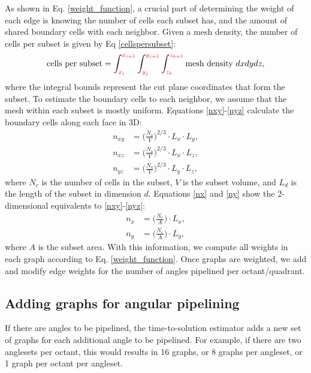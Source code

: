 As shown in Eq. \ref{weight_function}, a crucial part of determining the weight of each edge is knowing the number of cells each subset has, and the amount of shared boundary cells with each neighbor. Given a mesh density, the number of cells per subset is given by Eq \ref{cellspersubset}:
\begin{equation}
   \text{cells per subset} = \int_{\textcolor{red}{x_i}}^{\textcolor{red}{x_{i+1}}} \int_{\textcolor{red}{y_j}}^{\textcolor{red}{y_{j+1}}} \int_{\textcolor{red}{z_k}}^{\textcolor{red}{z_{k+1}}} \text{mesh density } dx dy dz,
\label{cellspersubset}
\end{equation}
where the integral bounds represent the cut plane coordinates that form the subset. To estimate the boundary cells to each neighbor, we assume that the mesh within each subset is mostly uniform. Equations \ref{nxy}-\ref{nyz} calculate the boundary cells along each face in 3D:
\begin{align}
n_{xy} &= \Big(\frac{N_c}{V}\Big)^{2/3}\cdot L_x\cdot L_y \label{nxy}, \\
n_{xz} &= \Big(\frac{N_c}{V}\Big)^{2/3}\cdot L_x\cdot L_z \label{nxz}, \\
n_{yz} &= \Big(\frac{N_c}{V}\Big)^{2/3}\cdot L_y\cdot L_z \label{nyz},
\end{align}
where $N_c$ is the number of cells in the subset, $V$ is the subset volume, and $L_d$ is the length of the subset in dimension $d$.
Equations \ref{nx} and \ref{ny} show the 2-dimensional equivalents to \ref{nxy}-\ref{nyz}:
\begin{align}
n_x &= \Big(\frac{N_c}{A}\Big)\cdot L_x, \label{nx} \\
n_y &= \Big(\frac{N_c}{A}\Big)\cdot L_y, \label{ny}
\end{align}
where $A$ is the subset area. With this information, we compute all weights in each graph according to Eq. \ref{weight_function}. Once graphs are weighted, we add and modify edge weights for the number of angles pipelined per octant/quadrant.

\subsection{Adding graphs for angular pipelining}

If there are angles to be pipelined, the time-to-solution estimator adds a new set of graphs for each additional angle to be pipelined. For example, if there are two anglesets per octant, this would results in 16 graphs, or 8 graphs per angleset, or 1 graph per octant per angleset.

